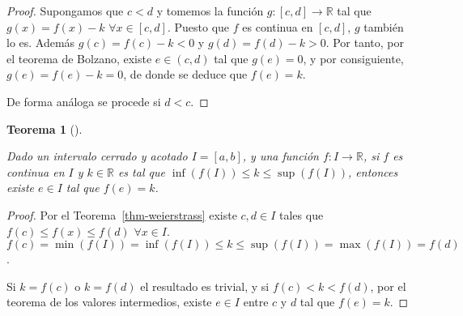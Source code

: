 \documentclass[
  a4paper,
]{scrreport}
\theoremstyle{plain}
\newtheorem{theorem}{Teorema}[chapter]
\theoremstyle{definition}
\theoremstyle{plain}
\theoremstyle{plain}
\theoremstyle{definition}
\theoremstyle{definition}
\theoremstyle{remark}
\begin{document}
\begin{tcolorbox}[enhanced jigsaw, titlerule=0mm, arc=.35mm, colframe=quarto-callout-note-color-frame, bottomrule=.15mm, opacitybacktitle=0.6, rightrule=.15mm, coltitle=black, colback=white, toprule=.15mm, title=\textcolor{quarto-callout-note-color}{\faInfo}\hspace{0.5em}{Demostración}, leftrule=.75mm, bottomtitle=1mm, opacityback=0, breakable, colbacktitle=quarto-callout-note-color!10!white, toptitle=1mm, left=2mm]

\begin{proof}
Supongamos que \(c<d\) y tomemos la función \(g:[c,d]\to\mathbb{R}\) tal
que \(g(x)=f(x)-k\) \(\forall x\in[c,d]\). Puesto que \(f\) es continua
en \([c,d]\), \(g\) también lo es. Además \(g(c)=f(c)-k<0\) y
\(g(d)=f(d)-k>0\). Por tanto, por el teorema de Bolzano, existe
\(e\in(c,d)\) tal que \(g(e)=0\), y por consiguiente, \(g(e)=f(e)-k=0\),
de donde se deduce que \(f(e)=k\).

De forma análoga se procede si \(d<c\).
\end{proof}

\end{tcolorbox}

\begin{theorem}[]\protect\hypertarget{thm-valores-intermedios}{}\label{thm-valores-intermedios}

Dado un intervalo cerrado y acotado \(I=[a,b]\), y una función
\(f:I\to\mathbb{R}\), si \(f\) es continua en \(I\) y \(k\in\mathbb{R}\)
es tal que \(\inf(f(I))\leq k\leq \sup(f(I))\), entonces existe
\(e\in I\) tal que \(f(e)=k\).

\end{theorem}

\begin{tcolorbox}[enhanced jigsaw, titlerule=0mm, arc=.35mm, colframe=quarto-callout-note-color-frame, bottomrule=.15mm, opacitybacktitle=0.6, rightrule=.15mm, coltitle=black, colback=white, toprule=.15mm, title=\textcolor{quarto-callout-note-color}{\faInfo}\hspace{0.5em}{Demostración}, leftrule=.75mm, bottomtitle=1mm, opacityback=0, breakable, colbacktitle=quarto-callout-note-color!10!white, toptitle=1mm, left=2mm]

\begin{proof}
Por el Teorema~\ref{thm-weierstrass} existe \(c,d\in I\) tales que
\(f(c)\leq f(x)\leq f(d)\) \(\forall x\in I\).
\(f(c)=\min(f(I))=\inf(f(I))\leq k\leq \sup(f(I))=\max(f(I))=f(d)\).

Si \(k=f(c)\) o \(k=f(d)\) el resultado es trivial, y si
\(f(c)<k<f(d)\), por el teorema de los valores intermedios, existe
\(e\in I\) entre \(c\) y \(d\) tal que \(f(e)=k\).
\end{proof}

\end{tcolorbox}
\end{document}
